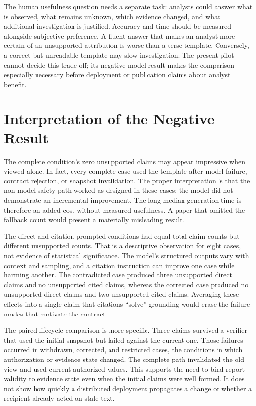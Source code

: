 The human usefulness question needs a separate task: analysts could answer what is observed, what remains unknown, which evidence changed, and what additional investigation is justified. Accuracy and time should be measured alongside subjective preference. A fluent answer that makes an analyst more certain of an unsupported attribution is worse than a terse template. Conversely, a correct but unreadable template may slow investigation. The present pilot cannot decide this trade-off; its negative model result makes the comparison especially necessary before deployment or publication claims about analyst benefit.

\section{Interpretation of the Negative Result}
The complete condition's zero unsupported claims may appear impressive when viewed alone. In fact, every complete case used the template after model failure, contract rejection, or snapshot invalidation. The proper interpretation is that the non-model safety path worked as designed in these cases; the model did not demonstrate an incremental improvement. The long median generation time is therefore an added cost without measured usefulness. A paper that omitted the fallback count would present a materially misleading result.

The direct and citation-prompted conditions had equal total claim counts but different unsupported counts. That is a descriptive observation for eight cases, not evidence of statistical significance. The model's structured outputs vary with context and sampling, and a citation instruction can improve one case while harming another. The contradicted case produced three unsupported direct claims and no unsupported cited claims, whereas the corrected case produced no unsupported direct claims and two unsupported cited claims. Averaging these effects into a single claim that citations ``solve'' grounding would erase the failure modes that motivate the contract.

The paired lifecycle comparison is more specific. Three claims survived a verifier that used the initial snapshot but failed against the current one. Those failures occurred in withdrawn, corrected, and restricted cases, the conditions in which authorization or evidence state changed. The complete path invalidated the old view and used current authorized values. This supports the need to bind report validity to evidence state even when the initial claims were well formed. It does not show how quickly a distributed deployment propagates a change or whether a recipient already acted on stale text.

